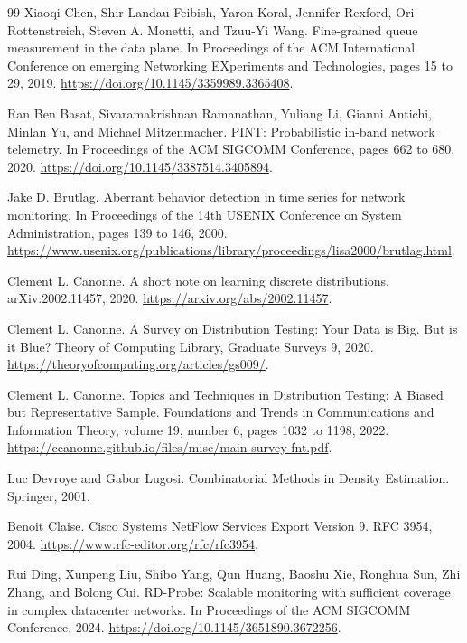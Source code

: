 \documentclass[a4paper,11pt]{report}
\begin{document}
\begin{thebibliography}{99}
Xiaoqi Chen, Shir Landau Feibish, Yaron Koral, Jennifer Rexford, Ori Rottenstreich, Steven A. Monetti, and Tzuu-Yi Wang.
\newblock Fine-grained queue measurement in the data plane.
\newblock In Proceedings of the ACM International Conference on emerging Networking EXperiments and Technologies, pages 15 to 29, 2019.
\newblock \url{https://doi.org/10.1145/3359989.3365408}.

Ran Ben Basat, Sivaramakrishnan Ramanathan, Yuliang Li, Gianni Antichi, Minlan Yu, and Michael Mitzenmacher.
\newblock PINT: Probabilistic in-band network telemetry.
\newblock In Proceedings of the ACM SIGCOMM Conference, pages 662 to 680, 2020.
\newblock \url{https://doi.org/10.1145/3387514.3405894}.

Jake D. Brutlag.
\newblock Aberrant behavior detection in time series for network monitoring.
\newblock In Proceedings of the 14th USENIX Conference on System Administration, pages 139 to 146, 2000.
\newblock \url{https://www.usenix.org/publications/library/proceedings/lisa2000/brutlag.html}.

Clement L. Canonne.
\newblock A short note on learning discrete distributions.
\newblock arXiv:2002.11457, 2020.
\newblock \url{https://arxiv.org/abs/2002.11457}.

Clement L. Canonne.
\newblock A Survey on Distribution Testing: Your Data is Big. But is it Blue?
\newblock Theory of Computing Library, Graduate Surveys 9, 2020.
\newblock \url{https://theoryofcomputing.org/articles/gs009/}.

Clement L. Canonne.
\newblock Topics and Techniques in Distribution Testing: A Biased but Representative Sample.
\newblock Foundations and Trends in Communications and Information Theory, volume 19, number 6, pages 1032 to 1198, 2022.
\newblock \url{https://ccanonne.github.io/files/misc/main-survey-fnt.pdf}.

Luc Devroye and Gabor Lugosi.
\newblock Combinatorial Methods in Density Estimation.
\newblock Springer, 2001.

Benoit Claise.
\newblock Cisco Systems NetFlow Services Export Version 9.
\newblock RFC 3954, 2004.
\newblock \url{https://www.rfc-editor.org/rfc/rfc3954}.

Rui Ding, Xunpeng Liu, Shibo Yang, Qun Huang, Baoshu Xie, Ronghua Sun, Zhi Zhang, and Bolong Cui.
\newblock RD-Probe: Scalable monitoring with sufficient coverage in complex datacenter networks.
\newblock In Proceedings of the ACM SIGCOMM Conference, 2024.
\newblock \url{https://doi.org/10.1145/3651890.3672256}.


\end{thebibliography}
\end{document}
